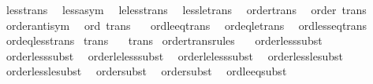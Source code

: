 \begin{isabellebody}
\ \ less{\isacharunderscore}{\kern0pt}trans\isanewline
\ \ less{\isacharunderscore}{\kern0pt}asym{\isacharprime}{\kern0pt}\isanewline
\ \ le{\isacharunderscore}{\kern0pt}less{\isacharunderscore}{\kern0pt}trans\isanewline
\ \ less{\isacharunderscore}{\kern0pt}le{\isacharunderscore}{\kern0pt}trans\isanewline
\ \ order{\isacharunderscore}{\kern0pt}trans\isanewline
\isanewline
{}\isamarkupfalse%
\ {\isacharparenleft}{\kern0pt}\ order{\isacharparenright}{\kern0pt}\ {\isacharbrackleft}{\kern0pt}trans{\isacharbrackright}{\kern0pt}\ {\isacharequal}{\kern0pt}\isanewline
\ \ order{\isachardot}{\kern0pt}antisym\isanewline
\isanewline
{}\isamarkupfalse%
\ {\isacharparenleft}{\kern0pt}\ ord{\isacharparenright}{\kern0pt}\ {\isacharbrackleft}{\kern0pt}trans{\isacharbrackright}{\kern0pt}\ {\isacharequal}{\kern0pt}\isanewline
\ \ ord{\isacharunderscore}{\kern0pt}le{\isacharunderscore}{\kern0pt}eq{\isacharunderscore}{\kern0pt}trans\isanewline
\ \ ord{\isacharunderscore}{\kern0pt}eq{\isacharunderscore}{\kern0pt}le{\isacharunderscore}{\kern0pt}trans\isanewline
\ \ ord{\isacharunderscore}{\kern0pt}less{\isacharunderscore}{\kern0pt}eq{\isacharunderscore}{\kern0pt}trans\isanewline
\ \ ord{\isacharunderscore}{\kern0pt}eq{\isacharunderscore}{\kern0pt}less{\isacharunderscore}{\kern0pt}trans\isanewline
\isanewline
{}\isamarkupfalse%
\ {\isacharbrackleft}{\kern0pt}trans{\isacharbrackright}{\kern0pt}\ {\isacharequal}{\kern0pt}\isanewline
\ \ trans\isanewline
\isanewline
{}\isamarkupfalse%
\ order{\isacharunderscore}{\kern0pt}trans{\isacharunderscore}{\kern0pt}rules\ {\isacharequal}{\kern0pt}\isanewline
\ \ order{\isacharunderscore}{\kern0pt}less{\isacharunderscore}{\kern0pt}subst{}\isanewline
\ \ order{\isacharunderscore}{\kern0pt}less{\isacharunderscore}{\kern0pt}subst{}\isanewline
\ \ order{\isacharunderscore}{\kern0pt}le{\isacharunderscore}{\kern0pt}less{\isacharunderscore}{\kern0pt}subst{}\isanewline
\ \ order{\isacharunderscore}{\kern0pt}le{\isacharunderscore}{\kern0pt}less{\isacharunderscore}{\kern0pt}subst{}\isanewline
\ \ order{\isacharunderscore}{\kern0pt}less{\isacharunderscore}{\kern0pt}le{\isacharunderscore}{\kern0pt}subst{}\isanewline
\ \ order{\isacharunderscore}{\kern0pt}less{\isacharunderscore}{\kern0pt}le{\isacharunderscore}{\kern0pt}subst{}\isanewline
\ \ order{\isacharunderscore}{\kern0pt}subst{}\isanewline
\ \ order{\isacharunderscore}{\kern0pt}subst{}\isanewline
\ \ ord{\isacharunderscore}{\kern0pt}le{\isacharunderscore}{\kern0pt}eq{\isacharunderscore}{\kern0pt}subst\isanewline

\end{isabellebody}
